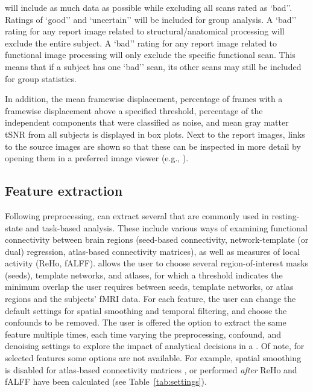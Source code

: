  will include as much data as possible while excluding all
scans rated as `bad''. Ratings of `good'' and
`uncertain'' will be included for group analysis. A `bad'' rating for any
report image related to structural/anatomical processing will exclude the
entire subject. A `bad'' rating for any report image related to functional 
image processing will only exclude the specific functional scan. This
means that if a subject has one `bad'' scan, its other scans may still be
included for group statistics.

In addition, the mean framewise displacement, percentage of frames with a
framewise displacement above a specified threshold, percentage of the
independent components that were classified as noise, and mean gray matter
tSNR from all subjects is displayed in box plots. Next to the report
images, links to the source images are shown so that these can be inspected
in more detail by opening them in a preferred image viewer (e.g.,
).

\subsection{Feature extraction}

Following preprocessing,  can extract several
 that are commonly used in resting-state and task-based
analysis. These include various ways of examining functional connectivity
between brain regions (seed-based connectivity, network-template (or dual)
regression, atlas-based connectivity matrices), as well as measures of
local activity (ReHo, fALFF).  allows the user to choose
several region-of-interest masks (seeds), template networks, and atlases,
for which a threshold indicates the minimum overlap the user requires
between seeds, template networks, or atlas regions and the subjects' fMRI
data. For each feature, the user can change the default settings for
spatial smoothing and temporal filtering, and choose the confounds to be
removed. The user is offered the option to extract the same feature
multiple times, each time varying the preprocessing, confound, and
denoising settings to explore the impact of analytical decisions in a
. Of note, for selected features some options are
not available. For example, spatial smoothing is disabled for atlas-based
connectivity matrices \citep{10.1111/ejn.13717}, or performed \emph{after}
ReHo and fALFF have been calculated (see Table~\ref{tab:settings}).

